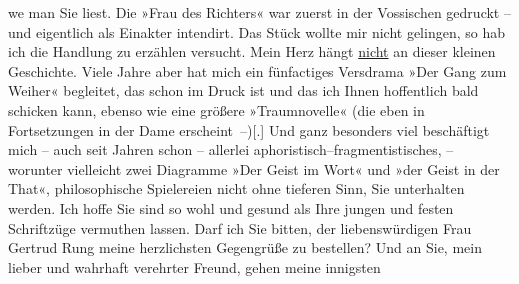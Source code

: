 \begin{ledgroupsized}[t]{13cm}
                        we{\geminationn} man Sie liest.\pend
           \pstart
           Die »Frau des Richters« war zuerst in der Vossischen gedruckt – und eigentlich als
                    Einakter intendirt. Das Stück wollte mir nicht gelingen, so hab ich die Handlung
                    zu erzählen versucht. Mein Herz hängt \uline{nicht} an
                    dieser kleinen Geschichte. Viele Jahre aber hat mich ein fünfactiges Versdrama
                        »Der Gang zum Weiher« begleitet, das schon
                    im Druck ist und das ich Ihnen hoffentlich bald schicken kann, ebenso wie eine
                    größere »Traumnovelle« (die eben in
                    Fortsetzungen in der Dame
                        erscheint –){[}.{]}{ }{\pb}Und ganz besonders viel beschäftigt mich –
                    auch seit Jahren schon – allerlei aphoristisch–fragmentistisches, – worunter
                    vielleicht zwei Diagramme »Der Geist im Wort« und
                        »der Geist in der That«, philosophische Spielereien nicht ohne tieferen
                    Sinn, Sie unterhalten werden.\pend
           \pstart
           Ich hoffe Sie sind so wohl und gesund als Ihre jungen und festen Schriftzüge
                    vermuthen lassen. Darf ich Sie bitten, der liebenswürdigen Frau Gertrud Rung meine herzlichsten Gegengrüße zu bestellen?
                    Und an Sie, mein lieber und wahrhaft verehrter Freund, gehen meine innigsten

\end{ledgroupsized}
